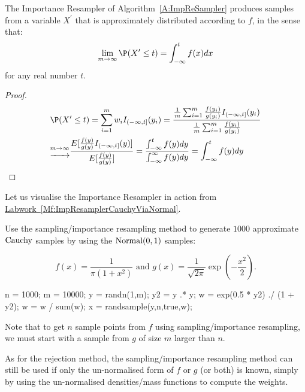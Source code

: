 {\begin{prop}The Importance Resampler of Algorithm~\ref{A:ImpReSampler} produces samples from a variable $X^{\prime}$ that is approximately distributed according to $f$, in the sense that:
\begin{equation}
\lim_{m\rightarrow \infty}\P( X^{\prime} \leq t)=\int^t_{-\infty}f(x)dx
\end{equation}
for any real number $t$.
\begin{proof}
\begin{displaymath}
\begin{split}
&\P(X^{\prime}\leq t)=\sum^m_{i=1}w_iI_{(-\infty,t]}(y_i)=\frac{\frac{1}{m}\sum^m_{i=1}\frac{f(y_i)}{g(y_i)}I_{(-\infty,t]}(y_i)}{\frac{1}{m}\sum^m_{i=1}\frac{f(y_i)}{g(y_i)}}\\
&\underrightarrow{^{m\rightarrow\infty}}\frac{E [\frac{f(y)}{g(y)}I_{(-\infty,t]}(y)]}{E[\frac{f(y)}{g(y)}]}=\frac{\int^t_{-\infty}f(y)dy}{{\int^{\infty}_{-\infty}f(y)dy}}=\int^t_{-\infty}f(y)dy\\
\end{split}
\end{displaymath}
\end{proof}
\end{prop}

Let us visualise the Importance Resampler in action from \hyperref[Mf:ImpResamplerCauchyViaNormal]{Labwork~\ref*{Mf:ImpResamplerCauchyViaNormal}}.

\begin{labwork}
Use the sampling/importance resampling method to generate $1000$ approximate $\mbox{{\rm Cauchy}}$ samples  by using the $\mbox{{\rm Normal}}(0,1)$ samples:

$$f(x)=\frac{1}{\pi(1+x^2)} \textrm{ and  } g(x)=\frac{1}{\sqrt{2\pi}}\exp\left(-\frac{x^2}{2}\right).$$

\begin{VrbM}
n = 1000;
m = 10000;
y = randn(1,m); %
y2 = y .* y;
w = exp(0.5 * y2) ./ (1 + y2);
w = w / sum(w);
x = randsample(y,n,true,w); %
\end{VrbM}
\end{labwork}

Note that to get $n$ sample points from $f$ using sampling/importance resampling, we must start with a sample from $g$ of size $m$ larger than $n$.

As for the rejection method, the sampling/importance resampling method can still be used if only the un-normalised form of $f$ or $g$ (or both) is known, simply by using the un-normalised densities/mass functions to compute the weights.
}

